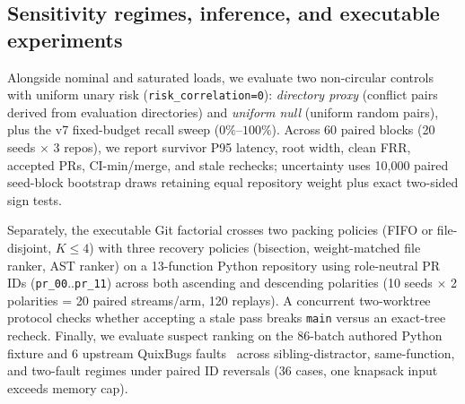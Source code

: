 \subsection{Sensitivity regimes, inference, and executable experiments}
Alongside nominal and saturated loads, we evaluate two non-circular controls with uniform unary risk (\texttt{risk\_correlation=0}): \emph{directory proxy} (conflict pairs derived from evaluation directories) and \emph{uniform null} (uniform random pairs), plus the v7 fixed-budget recall sweep ($0\%$--$100\%$). Across 60 paired blocks (20 seeds $\times$ 3 repos), we report survivor P95 latency, root width, clean FRR, accepted PRs, CI-min/merge, and stale rechecks; uncertainty uses 10,000 paired seed-block bootstrap draws retaining equal repository weight plus exact two-sided sign tests.

Separately, the executable Git factorial crosses two packing policies (FIFO or file-disjoint, $K{\le}4$) with three recovery policies (bisection, weight-matched file ranker, AST ranker) on a 13-function Python repository using role-neutral PR IDs (\texttt{pr\_00}..\texttt{pr\_11}) across both ascending and descending polarities (10 seeds $\times$ 2 polarities = 20 paired streams/arm, 120 replays). A concurrent two-worktree protocol checks whether accepting a stale pass breaks \texttt{main} versus an exact-tree recheck. Finally, we evaluate suspect ranking on the 86-batch authored Python fixture and 6 upstream QuixBugs faults~\cite{lin2017quixbugs} across sibling-distractor, same-function, and two-fault regimes under paired ID reversals (36 cases, one knapsack input exceeds memory cap).
